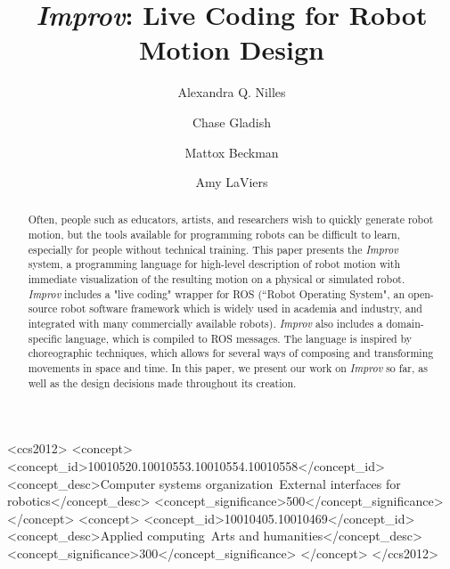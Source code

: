 \documentclass[sigchi-a]{acmart}
\begin{document}
\title{\emph{Improv}: Live Coding for Robot Motion Design}

\author{Alexandra Q. Nilles}

\author{Chase Gladish}

\author{Mattox Beckman}

\author{Amy LaViers}


\renewcommand{\shortauthors}{A. Nilles et al.}

 \begin{CCSXML}
<ccs2012>
<concept>
<concept_id>10010520.10010553.10010554.10010558</concept_id>
<concept_desc>Computer systems organization~External interfaces for
robotics</concept_desc>
<concept_significance>500</concept_significance>
</concept>
<concept>
<concept_id>10010405.10010469</concept_id>
<concept_desc>Applied computing~Arts and humanities</concept_desc>
<concept_significance>300</concept_significance>
</concept>
</ccs2012>
\end{CCSXML}


\begin{abstract}

Often, people such as educators, artists, and researchers wish to quickly
generate robot motion, but the tools available for programming robots can be difficult to
learn, especially for people without technical training.
This paper presents the \emph{Improv} system, a programming language for
high-level description of robot motion with immediate visualization of the
resulting motion on a physical or simulated robot. \emph{Improv} includes a 
"live coding" wrapper for ROS (``Robot Operating
System", an open-source robot software framework which is widely used in
academia and industry, and integrated with many commercially available robots).
\emph{Improv} also includes a domain-specific language, which is compiled to ROS
messages. The language is inspired by choreographic techniques, which allows for
several ways of composing and transforming movements in space and time. In this
paper, we present our work on \emph{Improv} so far, as well as the design decisions made
throughout its creation.
\end{abstract}
\end{document}
